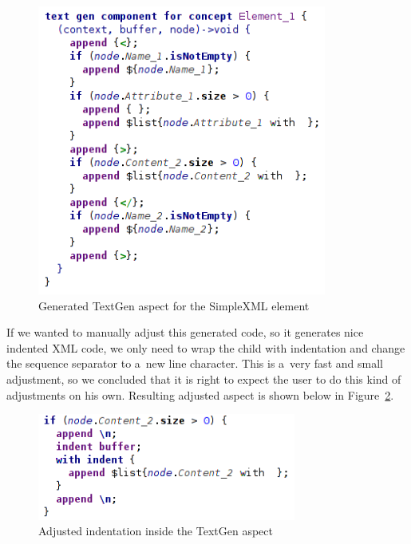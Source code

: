 \begin{figure}[h]
	\centering
	\includegraphics[width=95mm]{./img/textgen_final.png}
	\caption{Generated TextGen aspect for the SimpleXML element}
	\label{fig:textgen_final}
\end{figure}

If we wanted to manually adjust this generated code, so it generates nice indented XML code, we only need to wrap the  child with indentation and change the sequence separator to a~new line character.
This is a~very fast and small adjustment, so we concluded that it is right to expect the user to do this kind of adjustments on his own.
Resulting adjusted aspect is shown below in Figure~\ref{fig:textgen_adjusted}.

\begin{figure}[t!]
	\centering
	\includegraphics[width=85mm]{./img/textgen_adjusted.png}
	\caption{Adjusted indentation inside the TextGen aspect}
	\label{fig:textgen_adjusted}
\end{figure}
